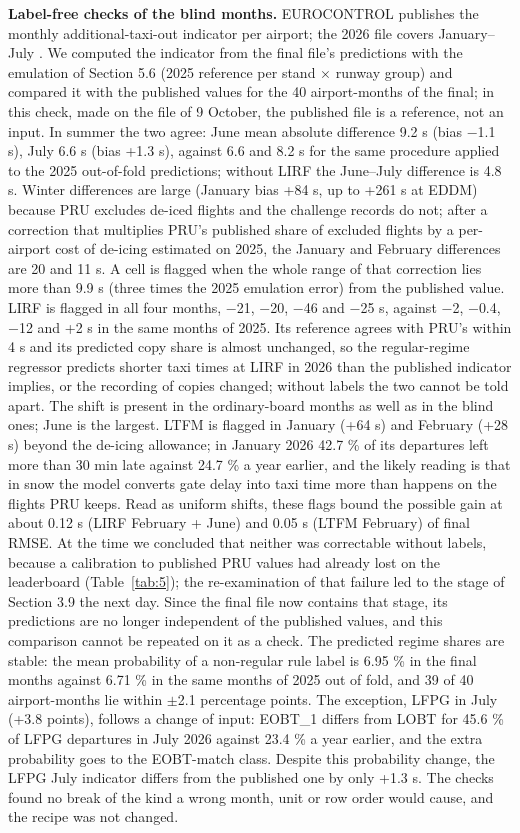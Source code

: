 \documentclass[
  manuscript=article,  %
  layout=preprint,     %
  year=2026,
  volume=4,
]{extra/joas}
\begin{document}
\textbf{Label-free checks of the blind months.} EUROCONTROL publishes the monthly additional-taxi-out indicator per airport; the 2026 file covers January--July \autocite{eurocontrol2026atxotdata}. We computed the indicator from the final file's predictions with the emulation of Section 5.6 (2025 reference per stand $\times$ runway group) and compared it with the published values for the 40 airport-months of the final; in this check, made on the file of 9 October, the published file is a reference, not an input. In summer the two agree: June mean absolute difference 9.2 s (bias $-$1.1 s), July 6.6 s (bias +1.3 s), against 6.6 and 8.2 s for the same procedure applied to the 2025 out-of-fold predictions; without LIRF the June--July difference is 4.8 s. Winter differences are large (January bias +84 s, up to +261 s at EDDM) because PRU excludes de-iced flights and the challenge records do not; after a correction that multiplies PRU's published share of excluded flights by a per-airport cost of de-icing estimated on 2025, the January and February differences are 20 and 11 s. A cell is flagged when the whole range of that correction lies more than 9.9 s (three times the 2025 emulation error) from the published value. LIRF is flagged in all four months, $-$21, $-$20, $-$46 and $-$25 s, against $-$2, $-$0.4, $-$12 and +2 s in the same months of 2025. Its reference agrees with PRU's within 4 s and its predicted copy share is almost unchanged, so the regular-regime regressor predicts shorter taxi times at LIRF in 2026 than the published indicator implies, or the recording of copies changed; without labels the two cannot be told apart. The shift is present in the ordinary-board months as well as in the blind ones; June is the largest. LTFM is flagged in January (+64 s) and February (+28 s) beyond the de-icing allowance; in January 2026 42.7 \% of its departures left more than 30 min late against 24.7 \% a year earlier, and the likely reading is that in snow the model converts gate delay into taxi time more than happens on the flights PRU keeps. Read as uniform shifts, these flags bound the possible gain at about 0.12 s (LIRF February + June) and 0.05 s (LTFM February) of final RMSE. At the time we concluded that neither was correctable without labels, because a calibration to published PRU values had already lost on the leaderboard (Table~\ref{tab:5}); the re-examination of that failure led to the stage of Section 3.9 the next day. Since the final file now contains that stage, its predictions are no longer independent of the published values, and this comparison cannot be repeated on it as a check. The predicted regime shares are stable: the mean probability of a non-regular rule label is 6.95 \% in the final months against 6.71 \% in the same months of 2025 out of fold, and 39 of 40 airport-months lie within $\pm$2.1 percentage points. The exception, LFPG in July (+3.8 points), follows a change of input: EOBT\_1 differs from LOBT for 45.6 \% of LFPG departures in July 2026 against 23.4 \% a year earlier, and the extra probability goes to the EOBT-match class. Despite this probability change, the LFPG July indicator differs from the published one by only +1.3 s. The checks found no break of the kind a wrong month, unit or row order would cause, and the recipe was not changed.
\end{document}
